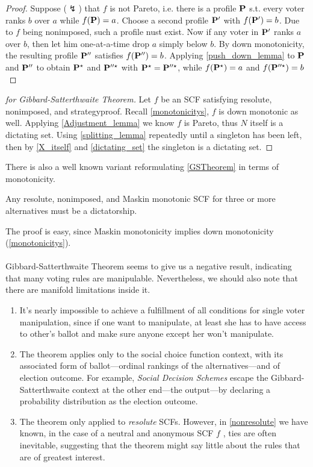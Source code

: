 \begin{proof}
    Suppose ($\lightning$) that $f$ is not Pareto, i.e. there is a profile $\mathbf{P}$ s.t. every voter ranks $b$ over $a$ while $f(\mathbf{P}) = a$. Choose a second profile $\mathbf{P}'$ with $f(\mathbf{P}') = b$. Due to $f$ being nonimposed, such a profile nust exist. Now if any voter in $\mathbf{P}'$ ranks $a$ over $b$, then let him one-at-a-time drop $a$ simply below $b$. By down monotonicity, the resulting profile $\mathbf{P}''$ satisfies $f(\mathbf{P}'') = b$. Applying \cref{push_down_lemma} to $\mathbf{P}$ and $\mathbf{P}''$ to obtain $\mathbf{P}^\star$ and $\mathbf{P}''^\star$ with $\mathbf{P}^\star = \mathbf{P}''^\star$, while $f(\mathbf{P}^\star) = a$ and $f(\mathbf{P}''^\star) = b$
\end{proof}

\begin{proof}[for Gibbard-Satterthwaite Theorem]
    Let $f$ be an SCF satisfying resolute, nonimposed, and strategyproof. Recall \cref{monotonicitys}, $f$ is down monotonic as well. Applying \cref{Adjustment_lemma} we know $f$ is Pareto, thus $N$ itself is a dictating set. Using \cref{splitting_lemma} repeatedly until a singleton has been left, then by \cref{X_itself} and \cref{dictating_set} the singleton is a dictating set.
\end{proof}

There is also a well known variant reformulating \cref{GSTheorem} in terms of monotonicity.

\begin{theorem}
    Any resolute, nonimposed, and Maskin monotonic SCF for three or more alternatives must be a dictatorship.
\end{theorem}

The proof is easy, since Maskin monotonicity implies down monotonicity (\cref{monotonicitys}).\\
~\\
Gibbard-Satterthwaite Theorem seems to give us a negative result, indicating that many voting rules are manipulable. Nevertheless, we should also note that there are manifold limitations inside it.

\begin{enumerate}
    \item It's nearly impossible to achieve a fulfillment of all conditions for single voter manipulation, since if one want to manipulate, at least she has to have access to other's ballot and make sure anyone except her won't manipulate.
    \item The theorem applies only to the social choice function context, with its associated form of ballot---ordinal rankings of the alternatives---and of election outcome. For example, \textit{Social Decision Schemes} escape the Gibbard-Satterthwaite context at the other end---the output---by declaring a probability distribution as the election outcome.
    \item The theorem only applied to \emph{resolute} SCFs. However, in \cref{nonresolute} we have known, in the case of a neutral and anonymous SCF $f$ , ties are often inevitable, suggesting that the theorem might say little about the rules that are of greatest interest.
\end{enumerate}

